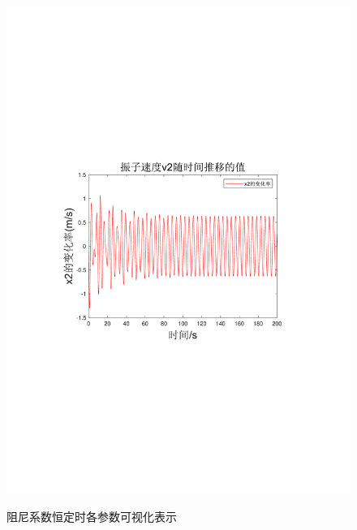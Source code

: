 \documentclass[12pt,utf8]{article}
\begin{document}
\begin{figure}[htbp]
\begin{minipage}{0.45\linewidth}
		\includegraphics[width=0.9\linewidth]{figures/T1-1振子速度v2.pdf}
		\label{chutian4}%
	\end{minipage}
\caption{阻尼系数恒定时各参数可视化表示}
\end{figure}
\end{document}
